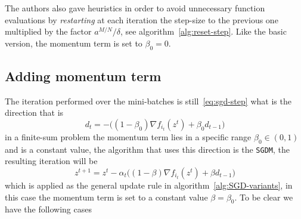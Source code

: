 The authors also gave heuristics in order to avoid unnecessary function evaluations by \emph{restarting} at each iteration the step-size to the previous one multiplied by the factor $a^{M/N}/\delta$, see algorithm~\vref{alg:reset-step}. Like the basic version, the momentum term is set to $\beta_0=0$.%

\subsection{Adding momentum term}\label{subsc:sgdm}

The iteration performed over the mini-batches is still~\eqref{eq:sgd-step} what is the direction that is
\[
d_t=-\bigl((1-\beta_0)\nabla f_{i_t}(z^t)+\beta_0d_{t-1}\bigr)
\]
in a finite-sum problem the momentum term lies in a specific range $\beta_0\in(0,1)$ and is a constant value, the algorithm that uses this direction is the \texttt{SGDM}, the resulting iteration will be
\begin{equation}\label{eq:sgdm-step}
z^{t+1}=z^t-\alpha_t\bigl((1-\beta)\nabla f_{i_t}(z^t)+\beta d_{t-1}\bigr)
\end{equation}
which is applied as the general update rule in algorithm~\ref{alg:SGD-variants}, in this case the momentum term is set to a constant value $\beta=\beta_0$. To be clear we have the following cases
\begin{center}
\end{center}

